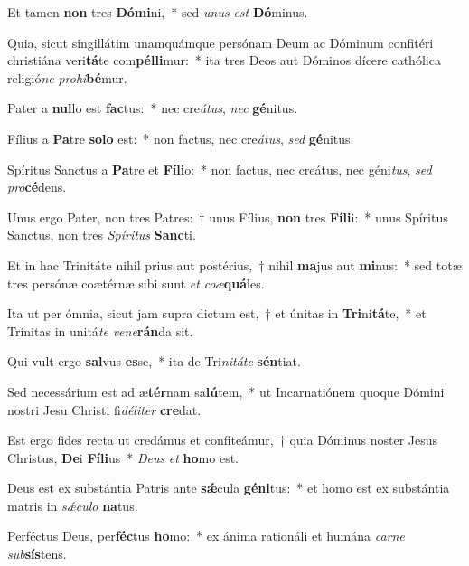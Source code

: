 \item Et tamen \textbf{non} tres \textbf{Dó}\textbf{mi}ni,~* sed \textit{u}\textit{nus} \textit{est} \textbf{Dó}minus.
\item Quia, sicut singillátim unamquámque persónam Deum ac Dóminum confitéri christiána veri\textbf{tá}te com\textbf{pél}\textbf{li}mur:~* ita tres Deos aut Dóminos dícere cathólica religió\textit{ne} \textit{pro}\textit{hi}\textbf{bé}mur.
\item Pater a \textbf{nul}lo est \textbf{fac}tus:~* nec cre\textit{á}\textit{tus}, \textit{nec} \textbf{gé}nitus.
\item Fílius a \textbf{Pa}tre \textbf{so}\textbf{lo} est:~* non factus, nec cre\textit{á}\textit{tus}, \textit{sed} \textbf{gé}nitus.
\item Spíritus Sanctus a \textbf{Pa}tre et \textbf{Fí}\textbf{li}o:~* non factus, nec creátus, nec géni\textit{tus}, \textit{sed} \textit{pro}\textbf{cé}dens.
\item Unus ergo Pater, non tres Patres:~† unus Fílius, \textbf{non} tres \textbf{Fí}\textbf{li}i:~* unus Spíritus Sanctus, non tres \textit{Spí}\textit{ri}\textit{tus} \textbf{Sanc}ti.
\item Et in hac Trinitáte nihil prius aut postérius,~† nihil \textbf{ma}jus aut \textbf{mi}nus:~* sed totæ tres persónæ coætérnæ sibi sunt \textit{et} \textit{co}\textit{æ}\textbf{quá}les.
\item Ita ut per ómnia, sicut jam supra dictum est,~† et únitas in \textbf{Tri}ni\textbf{tá}te,~* et Trínitas in unitá\textit{te} \textit{ve}\textit{ne}\textbf{rán}da sit.
\item Qui vult ergo \textbf{sal}vus \textbf{es}se,~* ita de Tri\textit{ni}\textit{tá}\textit{te} \textbf{sén}tiat.
\item Sed necessárium est ad æ\textbf{tér}nam sa\textbf{lú}tem,~* ut Incarnatiónem quoque Dómini nostri Jesu Christi fi\textit{dé}\textit{li}\textit{ter} \textbf{cre}dat.
\item Est ergo fides recta ut credámus et confiteámur,~† quia Dóminus noster Jesus Christus, \textbf{De}i \textbf{Fí}\textbf{li}us~* \textit{De}\textit{us} \textit{et} \textbf{ho}mo est.
\item Deus est ex substántia Patris ante \textbf{sǽ}cula \textbf{gé}\textbf{ni}tus:~* et homo est ex substántia matris in \textit{sǽ}\textit{cu}\textit{lo} \textbf{na}tus.
\item Perféctus Deus, per\textbf{féc}tus \textbf{ho}mo:~* ex ánima rationáli et humána \textit{car}\textit{ne} \textit{sub}\textbf{sís}tens.
